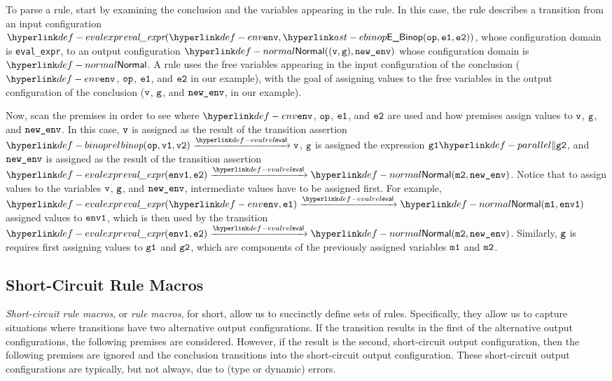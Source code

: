 To parse a rule, start by examining the conclusion and the variables appearing in the rule.
In this case, the rule describes a transition from an input configuration \\
$\evalexpr{ \env, \EBinop(\op, \veone, \vetwo) }$,
whose configuration domain is \texttt{eval\_expr}, to an output configuration $\Normal((\vv, \vg), \newenv)$
whose configuration domain is $\Normal$.
%
A rule uses the free variables appearing in the input configuration of the conclusion
($\env$, $\texttt{op}$, $\texttt{e1}$, and $\texttt{e2}$ in our example),
with the goal of assigning values to the free variables in the output configuration
of the conclusion ($\texttt{v}$, $\texttt{g}$, and $\texttt{new\_env}$, in our example).

Now, scan the premises in order to see where $\env$, $\texttt{op}$, $\texttt{e1}$, and $\texttt{e2}$ are used and how
premises assign values to $\texttt{v}$, $\texttt{g}$, and $\texttt{new\_env}$.
%
In this case, $\texttt{v}$ is assigned as the result of the transition assertion
$\binoprel(\op, \vvone, \vvtwo) \evalarrow \vv$,
$\texttt{g}$ is assigned the expression $\vgone \parallelcomp \vgtwo$,
and $\texttt{new\_env}$ is assigned as the result of the transition assertion
$\evalexpr{ \envone, \vetwo } \evalarrow \Normal(\vmtwo, \newenv)$.
%
Notice that to assign values to the variables $\texttt{v}$, $\texttt{g}$, and $\texttt{new\_env}$,
intermediate values have to be assigned first.
For example, $\evalexpr{ \env, \veone} \evalarrow \Normal(\vmone, \envone)$
assigned values to $\texttt{env1}$, which is then used by the transition \\
$\evalexpr{ \envone, \vetwo } \evalarrow \Normal(\vmtwo, \newenv)$.
Similarly, $\texttt{g}$ is requires first assigning values to $\texttt{g1}$ and $\texttt{g2}$,
which are components of the previously assigned variables $\texttt{m1}$ and $\texttt{m2}$.

\subsection{Short-Circuit Rule Macros}

\emph{Short-circuit rule macros}, or \emph{rule macros}, for short, allow us to succinctly define sets of rules.
Specifically, they allow us to capture situations where
transitions have two alternative output configurations.
If the transition results in the first of the alternative output configurations, the following premises are considered.
However, if the result is the second, short-circuit output configuration, then the following premises are ignored
and the conclusion transitions into the short-circuit output configuration.
These short-circuit output configurations are typically, but not always, due to (type or dynamic) errors.

